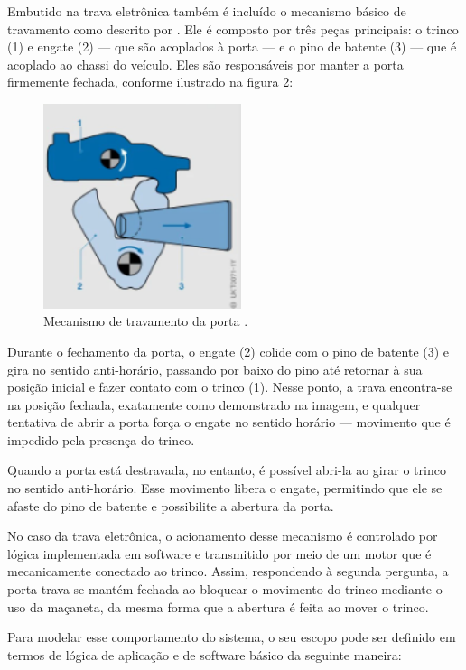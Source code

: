 Embutido na trava eletrônica também é incluído o mecanismo básico de travamento como descrito por \cite{reif2017locking}. Ele é composto por três peças principais: 
o trinco (1) e engate (2) — que são acoplados à porta — e  o pino de batente (3) — que é acoplado ao chassi do veículo. Eles são responsáveis por manter a porta 
firmemente fechada, conforme ilustrado na figura 2:

\begin{figure}[H]
\centering
\includegraphics[height=6cm]{figuras/trava_mecanismo.png}
\caption{Mecanismo de travamento da porta \cite{reif2017locking}.}
\label{fig:travaporta}
\end{figure}

Durante o fechamento da porta, o engate (2) colide com o pino de batente (3) e gira no sentido anti-horário, passando por baixo do pino até retornar à sua posição 
inicial e fazer contato com o trinco (1). Nesse ponto, a trava encontra-se na posição fechada, exatamente como demonstrado na imagem, e qualquer tentativa de abrir 
a porta força o engate no sentido horário — movimento que é impedido pela presença do trinco.

Quando a porta está destravada, no entanto, é possível abri-la ao girar o trinco no sentido anti-horário. Esse movimento libera o engate, permitindo que ele se 
afaste do pino de batente e possibilite a abertura da porta.

No caso da trava eletrônica, o acionamento desse mecanismo é controlado por lógica implementada em software e transmitido por meio de um motor que é mecanicamente 
conectado ao trinco. Assim, respondendo à segunda pergunta, a porta trava se mantém fechada ao bloquear o movimento do trinco mediante o uso da maçaneta, da mesma 
forma que a abertura é feita ao mover o trinco.

Para modelar esse comportamento do sistema, o seu escopo pode ser definido em termos de lógica de aplicação e de software básico da seguinte maneira:

